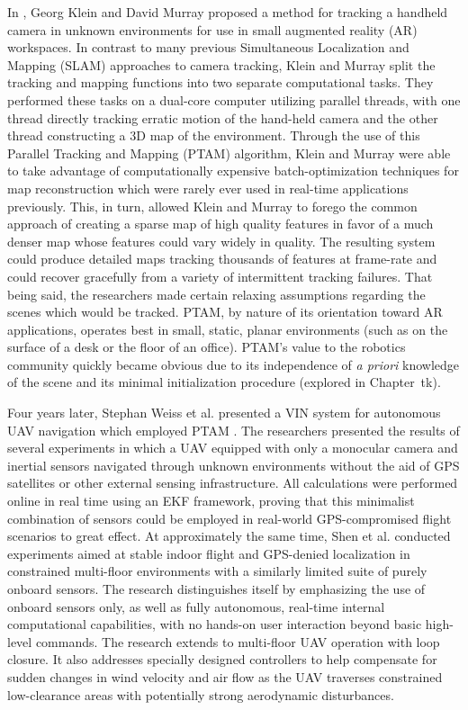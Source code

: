 In \cite{Klein2007}, Georg Klein and David Murray proposed a method for tracking a handheld camera in unknown environments for use in small augmented reality (AR) workspaces. In contrast to many previous Simultaneous Localization and Mapping (SLAM) approaches to camera tracking, Klein and Murray split the tracking and mapping functions into two separate computational tasks. They performed these tasks on a dual-core computer utilizing parallel threads, with one thread directly tracking erratic motion of the hand-held camera and the other thread constructing a 3D map of the environment. Through the use of this Parallel Tracking and Mapping (PTAM) algorithm, Klein and Murray were able to take advantage of computationally expensive batch-optimization techniques for map reconstruction which were rarely ever used in real-time applications previously. This, in turn, allowed Klein and Murray to forego the common approach of creating a sparse map of high quality features in favor of a much denser map whose features could vary widely in quality. The resulting system could produce detailed maps tracking thousands of features at frame-rate and could recover gracefully from a variety of intermittent tracking failures. That being said, the researchers made certain relaxing assumptions regarding the scenes which would be tracked. PTAM, by nature of its orientation toward AR applications, operates best in small, static, planar environments (such as on the surface of a desk or the floor of an office). PTAM's value to the robotics community quickly became obvious due to its independence of \textit{a priori} knowledge of the scene and its minimal initialization procedure (explored in Chapter~tk). 

Four years later, Stephan Weiss et al. presented a VIN system for autonomous UAV navigation which employed PTAM \cite{Weiss2011}. The researchers presented the results of several experiments in which a UAV equipped with only a monocular camera and inertial sensors navigated through unknown environments without the aid of GPS satellites or other external sensing infrastructure. All calculations were performed online in real time using an EKF framework, proving that this minimalist combination of sensors could be employed in real-world GPS-compromised flight scenarios to great effect. At approximately the same time, Shen et al. \cite{Shen2011} conducted experiments aimed at stable indoor flight and GPS-denied localization in constrained multi-floor environments with a similarly limited suite of purely onboard sensors. The research distinguishes itself by emphasizing the use of onboard sensors only, as well as fully autonomous, real-time internal computational capabilities, with no hands-on user interaction beyond basic high-level commands. The research extends to multi-floor UAV operation with loop closure. It also addresses specially designed controllers to help compensate for sudden changes in wind velocity and air flow as the UAV traverses constrained low-clearance areas with potentially strong aerodynamic disturbances.

